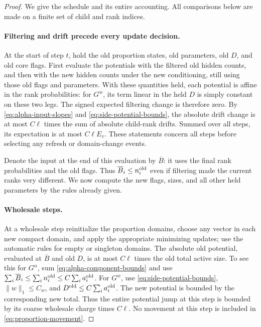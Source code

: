 \begin{proof}
We give the schedule and its entire accounting.  All comparisons
below are made on a finite set of child and rank indices.

\paragraph{Filtering and drift precede every update decision.}
At the start of step $t$, hold the old proportion states, old
parameters, old $D$, and old core flags.  First evaluate the
potentials with the filtered old hidden counts, and then with the
new hidden counts under the new conditioning, still using those
old flags and parameters.  With these quantities held, each
potential is affine in the rank probabilities: for $G^w$, its
term linear in the held $D$ is simply constant on these two legs.
The signed expected filtering change is therefore zero.  By
\eqref{eq:alpha-input-slopes} and \eqref{eq:side-potential-bounds},
the absolute drift change is at most $C\ell$ times the sum of
absolute child-rank drifts.  Summed over all steps, its expectation
is at most $C\ell E_v$.  These statements concern all steps
before selecting any refresh or domain-change events.

Denote the input at the end of this evaluation by $\overline B$:
it uses the final rank probabilities and the old flags.  Thus
$\overline B_i\le n_i^{\rm old}$ even if filtering made the
current ranks very different.  We now compute the new flags,
sizes, and all other held parameters by the rules already given.

\paragraph{Wholesale steps.}
At a wholesale step reinitialize the proportion domains, choose
any vector in each new compact domain, and apply the appropriate
minimizing updates; use the automatic rules for empty or singleton
domains.  The absolute old potential, evaluated at
$\overline B$ and old $D$, is at most $C\ell$ times the old
total active size.  To see this for $G^\alpha$, sum
\eqref{eq:alpha-component-bounds} and use
$\sum_i\overline B_i\le\sum_i n_i^{\rm old}\le
C\sum_i a_i^{\rm old}$.  For $G^w$, use
\eqref{eq:side-potential-bounds}, $\|w\|_1\le C_w$, and
$D^{\rm old}\le C\sum_i a_i^{\rm old}$.
The new potential is bounded by the corresponding new total.
Thus the entire potential jump at this step is bounded by its
coarse wholesale charge times $C\ell$.  No movement at this step
is included in \eqref{eq:proportion-movement}.


\end{proof}

